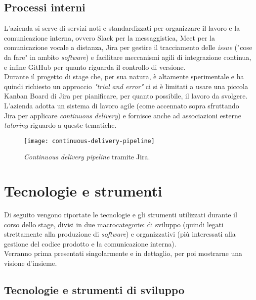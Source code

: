 \subsection{Processi interni}
L'azienda si serve di servizi noti e standardizzati per organizzare il lavoro e la comunicazione interna, ovvero Slack per la messaggistica, Meet per la comunicazione vocale a distanza, Jira per gestire il tracciamento delle \textit{issue} ("cose da fare" in ambito \textit{software}) e facilitare meccanismi agili di integrazione continua, e infine GitHub per quanto riguarda il controllo di versione.\\
Durante il progetto di stage che, per sua natura, è altamente sperimentale e ha quindi richiesto un approccio \textit{"trial and error"} ci si è limitati a usare una piccola Kanban Board di Jira per pianificare, per quanto possibile, il lavoro da svolgere.\\
L'azienda adotta un sistema di lavoro agile (come accennato sopra sfruttando Jira per applicare \textit{continuous delivery}) e fornisce anche ad associazioni esterne \textit{tutoring} riguardo a queste tematiche. 
\begin{figure}[H]
    \centering
    \texttt{[image: continuous-delivery-pipeline]}
    \caption[Jira \textit{continuous delivery pipeline}]{\textit{Continuous delivery pipeline} tramite Jira.\footnotemark}
\end{figure}

\section{Tecnologie e strumenti}
\label{sec:tecnologie-e-strumenti}
Di seguito vengono riportate le tecnologie e gli strumenti utilizzati durante il corso dello stage, divisi in due macrocategorie: di sviluppo (quindi legati strettamente alla produzione di \textit{software}) e organizzativi (più interessati alla gestione del codice prodotto e la comunicazione interna).\\
Verranno prima presentati singolarmente e in dettaglio, per poi mostrarne una visione d'insieme.

\subsection{Tecnologie e strumenti di sviluppo}
